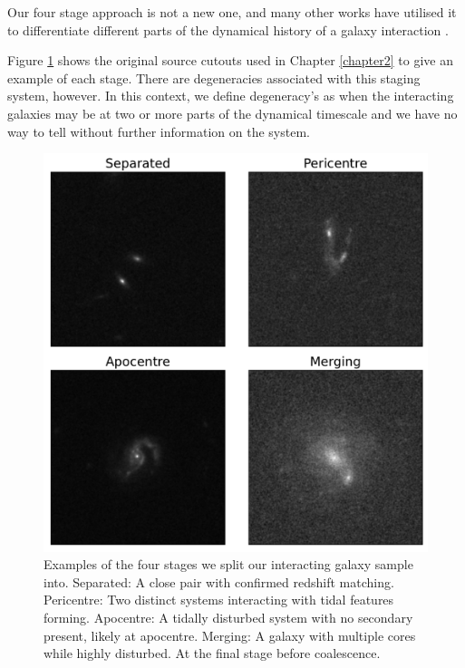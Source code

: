 \noindent Our four stage approach is not a new one, and many other works have utilised it to differentiate different parts of the dynamical history of a galaxy interaction \citep[e.g][]{2022ApJ...937...97C, 2023ApJ...952..122G}.

Figure \ref{fig:stages} shows the original source cutouts used in Chapter \ref{chapter2} to give an example of each stage. There are degeneracies associated with this staging system, however. In this context, we define degeneracy's as when the interacting galaxies may be at two or more parts of the dynamical timescale and we have no way to tell without further information on the system.

\begin{figure}
\centering
\includegraphics[width=\textwidth]{Chapter3/figures/examples-stages.pdf}
\caption[Examples of the four stages we split our interacting galaxy sample into.]{Examples of the four stages we split our interacting galaxy sample into. Separated: A close pair with confirmed redshift matching. Pericentre: Two distinct systems interacting with tidal features forming. Apocentre: A tidally disturbed system with no secondary present, likely at apocentre. Merging: A galaxy with multiple cores while highly disturbed. At the final stage before coalescence.}
\label{fig:stages}
\end{figure}

